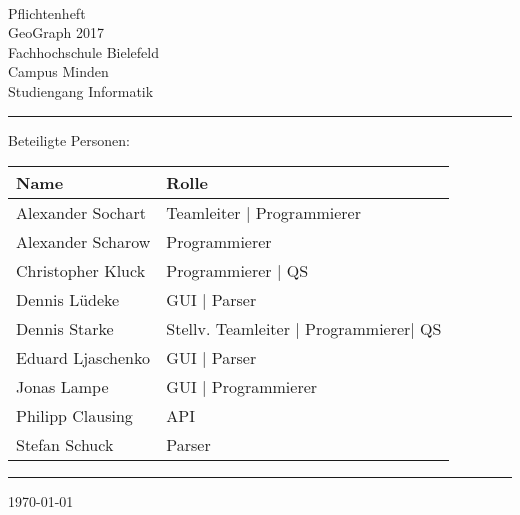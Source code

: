 


\begin{titlepage}
   \mbox{}\vspace{5\baselineskip}\\
   \sffamily\huge
   \centering
   {\Huge Pflichtenheft} \\
   \normalsize GeoGraph 2017
   \vspace{3\baselineskip}\\
   \rmfamily\Large
  Fachhochschule Bielefeld \\
  Campus Minden \\
  Studiengang Informatik
   \vspace{1\baselineskip}\\
\noindent\rule{15cm}{0.3pt}
Beteiligte Personen:
\begin{table}[H]
	\tablestyle
	\begin{tabular}{*{2}{v{0.45\textwidth}}}
		\hline
		\textbf{Name} &
		\textbf{Rolle} \tabularnewline
		\hline
		Alexander Sochart & Teamleiter | Programmierer\tabularnewline
		Alexander Scharow & Programmierer\tabularnewline
		Christopher Kluck & Programmierer | QS\tabularnewline
		Dennis Lüdeke & GUI | Parser\tabularnewline
		Dennis Starke  &  Stellv. Teamleiter | Programmierer| QS\tabularnewline
		Eduard Ljaschenko & GUI | Parser\tabularnewline
		Jonas Lampe & GUI | Programmierer\tabularnewline
		Philipp Clausing  & API \tabularnewline
		Stefan Schuck & Parser\tabularnewline
	\end{tabular}
\end{table}
   \noindent\rule{15cm}{0.4pt}

   \today
\end{titlepage}

